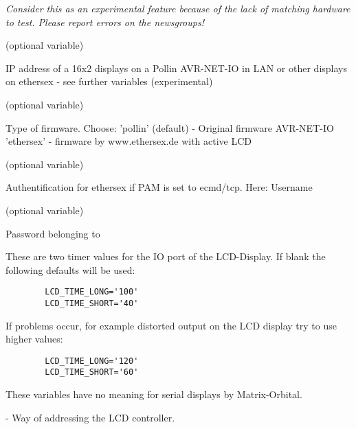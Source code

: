 \begin{description}
        \emph{Consider this as an experimental feature because of the lack of 
        matching hardware to test. Please report errors on the newsgroups!}

 (optional variable)

      IP address of a 16x2 displays on a Pollin AVR-NET-IO in LAN
      or other displays on ethersex - see further variables
      (experimental) 

 (optional variable)
      
      Type of firmware.
      Choose: 'pollin' (default) - Original firmware AVR-NET-IO
      'ethersex' - firmware by www.ethersex.de with active LCD
      
 (optional variable)
      
      Authentification for ethersex if PAM is set to ecmd/tcp.
      Here: Username

 (optional variable)
      
      Password belonging to 
      

      These are two timer values for the IO port of the LCD-Display.
      If blank the following defaults will be used:

\begin{example}
\begin{verbatim}
        LCD_TIME_LONG='100'
        LCD_TIME_SHORT='40'
\end{verbatim}
\end{example}

      If problems occur, for example distorted output on the LCD display 
      try to use higher values:
      
\begin{example}
\begin{verbatim}
        LCD_TIME_LONG='120'
        LCD_TIME_SHORT='60'
\end{verbatim}
\end{example}

      These variables have no meaning for serial displays by Matrix-Orbital.
      
 - Way of addressing the LCD controller.


\end{description}

